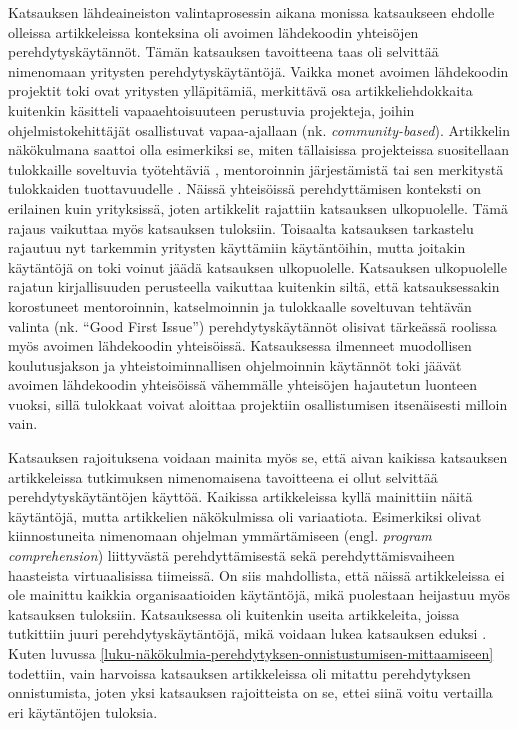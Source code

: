 \documentclass[utf8]{gradu3}
\begin{document}
Katsauksen lähdeaineiston valintaprosessin aikana monissa katsaukseen ehdolle olleissa artikkeleissa konteksina oli avoimen lähdekoodin yhteisöjen perehdytyskäytännöt. Tämän katsauksen tavoitteena taas oli selvittää nimenomaan yritysten perehdytyskäytäntöjä. Vaikka monet avoimen lähdekoodin projektit toki ovat yritysten ylläpitämiä, merkittävä osa artikkeliehdokkaita kuitenkin käsitteli vapaaehtoisuuteen perustuvia projekteja, joihin ohjelmistokehittäjät osallistuvat vapaa-ajallaan (nk. \textit{community-based}). Artikkelin näkökulmana saattoi olla esimerkiksi se, miten tällaisissa projekteissa suositellaan tulokkaille soveltuvia työtehtäviä %
\parencites%
    {horiguchi-ym-2021}%
    {steinmacher-ym-2015-GFI}%
    {balali-ym-2020}%
\relax
%
, mentoroinnin järjestämistä \parencite{canfora-ym-2012} tai sen merkitystä tulokkaiden tuottavuudelle \parencite{fagerholm-ym-2013}. Näissä yhteisöissä perehdyttämisen konteksti on erilainen kuin yrityksissä, joten artikkelit rajattiin katsauksen ulkopuolelle. Tämä rajaus vaikuttaa myös katsauksen tuloksiin. Toisaalta katsauksen tarkastelu rajautuu nyt tarkemmin yritysten käyttämiin käytäntöihin, mutta joitakin käytäntöjä on toki voinut jäädä katsauksen ulkopuolelle. Katsauksen ulkopuolelle rajatun kirjallisuuden perusteella vaikuttaa kuitenkin siltä, että katsauksessakin korostuneet mentoroinnin, katselmoinnin ja tulokkaalle soveltuvan tehtävän valinta (nk. ``Good First Issue'') perehdytyskäytännöt olisivat tärkeässä roolissa myös avoimen lähdekoodin yhteisöissä. Katsauksessa ilmenneet muodollisen koulutusjakson ja yhteistoiminnallisen ohjelmoinnin käytännöt toki jäävät avoimen lähdekoodin yhteisöissä vähemmälle yhteisöjen hajautetun luonteen vuoksi, sillä tulokkaat voivat aloittaa projektiin osallistumisen itsenäisesti milloin vain.

Katsauksen rajoituksena voidaan mainita myös se, että aivan kaikissa katsauksen artikkeleissa tutkimuksen nimenomaisena tavoitteena ei ollut selvittää perehdytyskäytäntöjen käyttöä. Kaikissa artikkeleissa kyllä mainittiin näitä käytäntöjä, mutta artikkelien näkökulmissa oli variaatiota. Esimerkiksi \textcite{yates-ym-2020} olivat kiinnostuneita nimenomaan ohjelman ymmärtämiseen (engl. \textit{program comprehension}) liittyvästä perehdyttämisestä sekä \textcite{hemphill-begel-2011} perehdyttämisvaiheen haasteista virtuaalisissa tiimeissä. On siis mahdollista, että näissä artikkeleissa ei ole mainittu kaikkia organisaatioiden käytäntöjä, mikä puolestaan heijastuu myös katsauksen tuloksiin. Katsauksessa oli kuitenkin useita artikkeleita, joissa tutkittiin juuri perehdytyskäytäntöjä, mikä voidaan lukea katsauksen eduksi
%
\parencites%
    {ju-ym-2021}%
    {britto-ym-2020}%
    {moe-ym-2020}%
    {viviani-murphy-2019}%
    {buchan-ym-2019}%
    {johnson-senges-2010}%
\relax.
%
Kuten luvussa \ref{luku-näkökulmia-perehdytyksen-onnistustumisen-mittaamiseen} todettiin, vain harvoissa katsauksen artikkeleissa oli mitattu perehdytyksen onnistumista, joten yksi katsauksen rajoitteista on se, ettei siinä voitu vertailla eri käytäntöjen tuloksia. 
\end{document}
